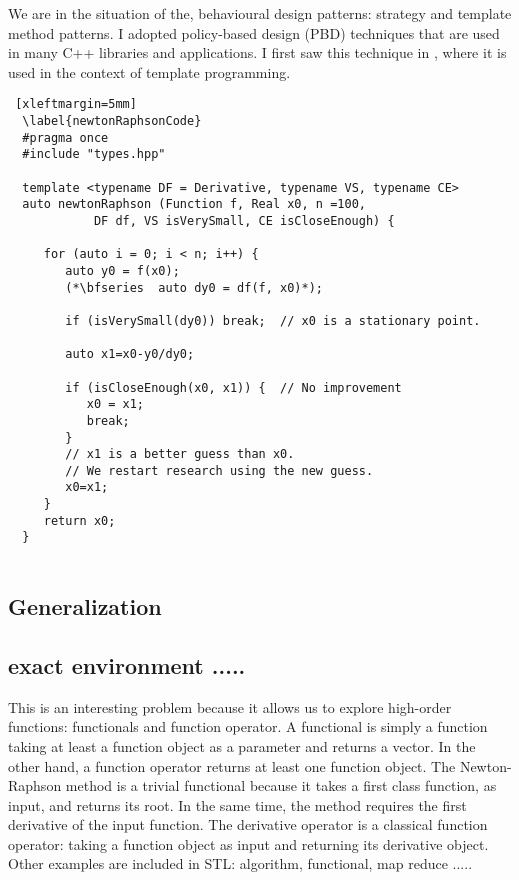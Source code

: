 \documentclass[12pt]{article}
\begin{document}
  		We are in the situation of the, behavioural design patterns: strategy and template method patterns.  
  I adopted policy-based design (PBD) techniques that are used in many C++ libraries and applications.  
  I first saw this technique in \citet*{alexandrescu}, where it is used in the context of template programming.
  
  
  \begin{lstlisting} [xleftmargin=5mm]
  \label{newtonRaphsonCode}
  #pragma once
  #include "types.hpp"
  
  template <typename DF = Derivative, typename VS, typename CE> 
  auto newtonRaphson (Function f, Real x0, n =100, 
  		    DF df, VS isVerySmall, CE isCloseEnough) {
  
     for (auto i = 0; i < n; i++) {
        auto y0 = f(x0);
        (*\bfseries  auto dy0 = df(f, x0)*);
  
        if (isVerySmall(dy0)) break;  // x0 is a stationary point.
        
        auto x1=x0-y0/dy0;
            
        if (isCloseEnough(x0, x1)) {  // No improvement 
           x0 = x1; 
           break;
        }   
        // x1 is a better guess than x0.
        // We restart research using the new guess.
        x0=x1;
     }   
     return x0; 
  }
  
  \end{lstlisting}
  
   \subsection {Generalization}
   \citet*{meyers2014effective} 
  \subsection {exact environment .....}
  
  This is an interesting problem because it allows us to explore high-order functions: functionals and function operator.
  A functional is simply a function taking at least a function object as a parameter and returns a vector.  In the other hand, a function operator returns at least one function object.
  The Newton-Raphson method is a trivial functional because it takes a first class function, as input,  and returns its root.  In the same time, the method requires the first derivative of the input function.  
  The derivative operator is a classical function operator: taking a function object as input and returning its derivative object. 
  Other examples are included in STL: algorithm, functional, map reduce .....
\end{document}
